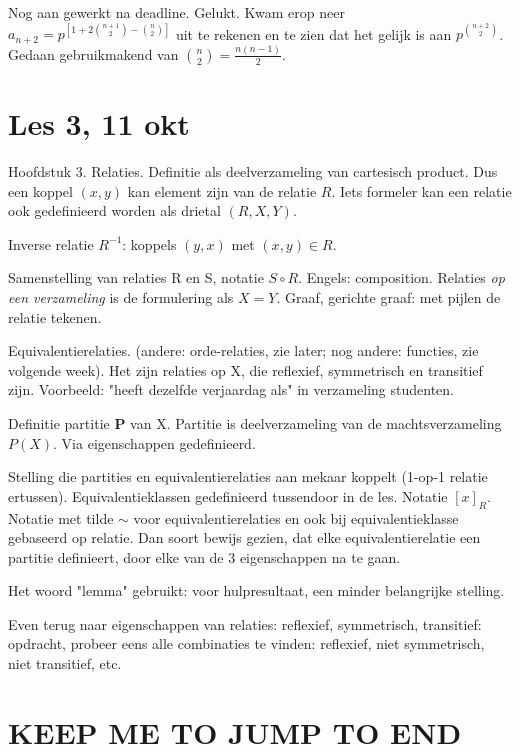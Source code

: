 \documentclass{article}
\begin{document}
Nog aan gewerkt na deadline. 
Gelukt. 
Kwam erop neer $a_{n+2}=p^{[1+2\binom{n+1}{2}-\binom{n}{2}]}$ uit te rekenen en te zien dat het gelijk is aan $p^{\binom{n+2}{2}}$. Gedaan gebruikmakend van $\binom{n}{2} = \frac{n(n-1)}{2}$. 

\section{Les 3, 11 okt}

Hoofdstuk 3. Relaties. Definitie als deelverzameling van cartesisch product. Dus een koppel $(x,y)$ kan element zijn van de relatie $R$. Iets formeler kan een relatie ook gedefinieerd worden als drietal $(R,X,Y)$. 

Inverse relatie $R^{-1}$: koppels $(y,x)$ met $(x,y) \in R$. 

Samenstelling van relaties R en S, notatie $S \circ R$. Engels: composition. Relaties \emph{op een verzameling} is de formulering als $X=Y$. Graaf, gerichte graaf: met pijlen de relatie tekenen. 

Equivalentierelaties. (andere: orde-relaties, zie later; nog andere: functies, zie volgende week). Het zijn relaties op X, die reflexief, symmetrisch en transitief zijn. Voorbeeld: "heeft dezelfde verjaardag als" in verzameling studenten. 

Definitie partitie $\mathbf{P}$ van X. Partitie is deelverzameling van de machtsverzameling $P(X)$. Via eigenschappen gedefinieerd. 

Stelling die partities en equivalentierelaties aan mekaar koppelt (1-op-1 relatie ertussen). Equivalentieklassen gedefinieerd tussendoor in de les. Notatie $[x]_R$. Notatie met tilde $\sim$ voor equivalentierelaties en ook bij equivalentieklasse gebaseerd op relatie.  Dan soort bewijs gezien, dat elke equivalentierelatie een partitie definieert, door elke van de 3 eigenschappen na te gaan. 

Het woord "lemma" gebruikt: voor hulpresultaat, een minder belangrijke stelling. 

Even terug naar eigenschappen van relaties: reflexief, symmetrisch, transitief: opdracht, probeer eens alle combinaties te vinden: reflexief, niet symmetrisch, niet transitief, etc. 



\section{KEEP ME TO JUMP TO END}
\end{document}
